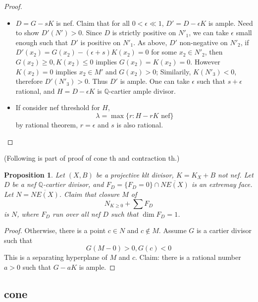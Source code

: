 \documentclass{article}
\newtheorem{prop}[defn]{Proposition}
\begin{document}
\begin{proof}
\begin{itemize}
    \item $ D=G-sK $ is nef. Claim that for all $ 0<\epsilon \ll 1 $, $ D'=D-\epsilon K $ is ample. Need to show $ D'(N')>0 $. Since $ D $ is strictly positive on $ N'_1 $, we can take $ \epsilon $ small enough such that $ D' $ is positive on $ N'_1 $. As above, $ D' $ non-negative on $ N'_2 $, if $ D'(x_2)=G(x_2)-(\epsilon +s)K(x_2)=0$ for some $ x_2\in N'_2 $, then $ G(x_2)\geqslant 0,K(x_2)\leqslant 0 $ implies $ G(x_2)=K(x_2)=0 $. However $ K(x_2)=0 $ implies $ x_2\in M' $ and $ G(x_2)>0 $;  Similarily, $ K(N'_3)<0 $, therefore $ D'(N'_3)>0 $. Thus $ D' $ is ample. One can take $ \epsilon $ such that $ s+\epsilon $ rational, and $ H=D-\epsilon K $ is $ \mathbb{Q} $-cartier ample divisor.
    \item If consider nef threshold for $ H $,
    \[ \lambda=\max\{r: H-rK \text{ nef}\} \]
    by rational theorem, $ r=\epsilon $ and $ s $ is also rational.
  \end{itemize}
  
  
  
\end{proof}


(Following is part of proof of cone th and contraction th.)
\begin{prop}
  Let $ (X,B) $ be a projective klt divisor, $ K=K_X+B $ not nef. Let $ D $ be a nef $ \mathbb{Q} $-cartier divisor, and $ F_D=\{F_D=0\}\cap \overline{NE(X)} $ is an extremay face. Let $ N=\overline{NE(X)} $. Claim that closure $ M $ of
  \[
    N_{K\geqslant 0}+\sum F_D
  \]
  is $ N $, where $ F_D $ run over all nef $ D $ such that $ \dim F_D=1 $. 
\end{prop}
\begin{proof}
  Otherwise, there is a point $ c\in N $ and $ c\notin M  $. Assume $ G $ is a cartier divisor such that 
  \[ G(M-0)>0,G(c)<0 \]
  This is a separating hyperplane of $ M $ and $ c $. Claim: there is a rational number $ a>0 $ such that $ G-aK $ is ample.
\end{proof}

\subsection{cone}
\end{document}
